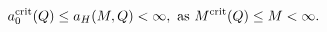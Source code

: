 \begin{equation}
a_0^{\rm crit} (Q) \le a_H (M,Q) < \infty, ~{\rm as}
~M^{\rm crit}(Q) \le M < \infty.
\end{equation}


